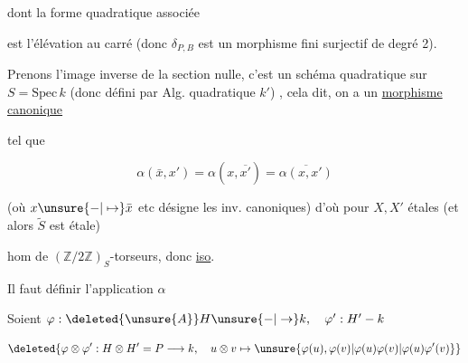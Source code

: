 
dont la forme quadratique associée


est l'élévation au carré (donc $\delta_{P,B}$
est  un morphisme fini
surjectif de degré 2).

Prenons l'image inverse de la section
nulle, c'est un schéma quadratique
 sur $S=\mathrm{Spec}\,k$ (donc défini par Alg.
quadratique $k'$) , cela dit, on a
un \uline{morphisme canonique}



 tel que

\[
\alpha(\bar x,x')=\alpha(x,\overline{x'})=\overline{\alpha(x,x')}
\]

(où $x\unsure{-|\mapsto}\bar x$ etc désigne les inv. canoniques)
d'où pour $X,X'$ étales (et alors $\widetilde S$ est étale)


 hom de $(\mathbb Z/2\mathbb Z)_S$-torseurs, donc \uline{iso}.

Il faut définir l'application $\alpha$

Soient $\varphi:\deleted{\unsure{A}}H\unsure{-|\to} k,\quad \varphi':H'-k$


\[
\deleted{\varphi\otimes\varphi':H\otimes H'=P\longrightarrow k,\quad u\otimes v\mapsto\unsure{\varphi(u),\varphi(v)|\varphi(u)\varphi(v)|\varphi(u)\varphi'(v)}} 
\]

